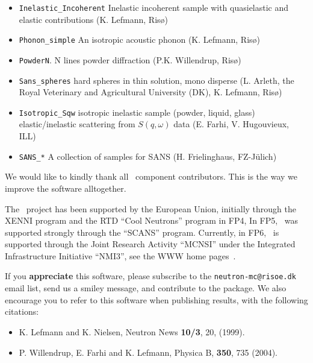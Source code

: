 \begin{itemize}
  \begin{itemize}
  \item \verb+Inelastic_Incoherent+ Inelastic incoherent sample with quasielastic and elastic contributions (K. Lefmann, Ris\o)
  \item \verb+Phonon_simple+ An isotropic acoustic phonon (K. Lefmann, Ris\o)
  \item \verb+PowderN+. N lines powder diffraction (P.K. Willendrup, Ris\o)
  \item \verb+Sans_spheres+ hard spheres in thin solution, mono disperse (L. Arleth, the Royal Veterinary and Agricultural University (DK), K. Lefmann, Ris\o )
  \item \verb+Isotropic_Sqw+ isotropic inelastic sample (powder, liquid, glass)
elastic/inelastic scattering from $S(q,\omega)$ data (E. Farhi, V. Hugouvieux, ILL)
  \item \verb+SANS_*+ A collection of samples for SANS (H. Frielinghaus,  FZ-J\"ulich)
  \end{itemize}
\end{itemize}

We would like to kindly thank all \MCS\ component contributors. This is the way we improve the software alltogether.

The \MCS\ project has been supported by the European Union, initially
through the XENNI program and the RTD ``Cool Neutrons'' program in FP4,
In FP5, \MCS\ was supported strongly through the
``SCANS'' program.
Currently, in FP6, \MCS\ is supported through the Joint Research Activity
``MCNSI'' under the Integrated Infrastructure Initiative ``NMI3'', see
the WWW home pages~\cite{mcnsi_webpage,nmi3_webpage}.

If you {\bf appreciate} this software, please subscribe to the \verb+neutron-mc@risoe.dk+ email list, send us a smiley message, and contribute to the package. We also encourage you to refer to this software when publishing results, with the following citations:
\begin{itemize}
\item{K. Lefmann and K. Nielsen, Neutron News {\bf 10/3}, 20, (1999).}
\item{P. Willendrup, E. Farhi and K. Lefmann, Physica B, {\bf 350}, 735 (2004).}
\end{itemize}






